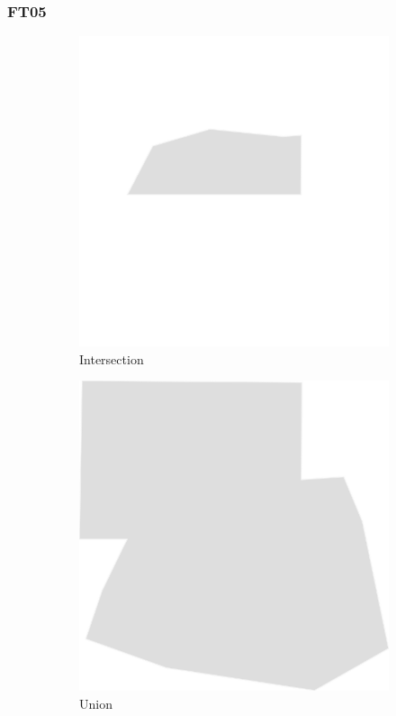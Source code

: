 \documentclass{beamer}
\begin{document}
\begin{frame}\frametitle{FT05}
\setcounter{subfigure}{0}\begin{figure}
\begin{subfigure}{.3\textwidth}
  \includegraphics[width=.7\linewidth]{../Abbildungen/st_intersection.png}
  \caption{Intersection}
\end{subfigure}%
\begin{subfigure}{.3\textwidth}
  \includegraphics[width=.7\linewidth]{../Abbildungen/st_union.png}
  \caption{Union}
\end{subfigure}
\begin{subfigure}{.3\textwidth}

\end{subfigure}
\end{figure}
\end{frame}
\end{document}
